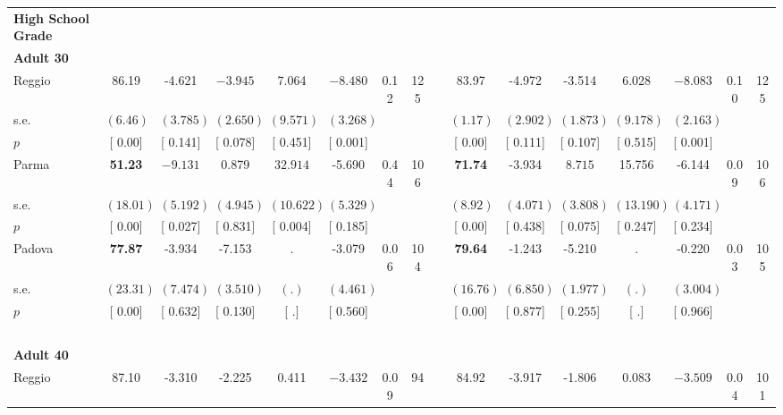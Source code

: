 \begin{longtable}{L{8em} c c c c c c c p{1em} c c c c c c c}
\textbf{High School Grade} \\*
\quad \quad \textbf{Adult 30} & & & & & & & & & & & & & & & \\* 
\quad \quad \quad Reggio& 86.19 &    -4.621 & $ \mathbf{   -3.945}$ &     7.064 & $ \mathbf{   -8.480}$ &      0.12 &       125 & & 83.97 &    -4.972 &    -3.514 &     6.028 & $ \mathbf{   -8.083}$ &      0.10 &       125  \\*
\quad \quad \quad \quad s.e.& $ (     6.46)$ & $ (    3.785)$ & $ (    2.650)$ & $ (    9.571)$ & $ (    3.268)$ & & & & $ (     1.17)$ & $ (    2.902)$ & $ (    1.873)$ & $ (    9.178)$ & $ (    2.163)$ & &  \\*
\quad \quad \quad \quad $ p$ & [     0.00] & [    0.141] & [    0.078] & [    0.451] & [    0.001] & & & & [     0.00] & [    0.111] & [    0.107] & [    0.515] & [    0.001] & &  \\[1em]
\quad \quad \quad Parma& \textbf{    51.23} & $ \mathbf{   -9.131}$ &     0.879 & $ \mathbf{   32.914}$ &    -5.690 &      0.44 &       106 & & \textbf{    71.74} &    -3.934 & $ \mathbf{    8.715}$ &    15.756 &    -6.144 &      0.09 &       106  \\*
\quad \quad \quad \quad s.e.& $ (    18.01)$ & $ (    5.192)$ & $ (    4.945)$ & $ (   10.622)$ & $ (    5.329)$ & & & & $ (     8.92)$ & $ (    4.071)$ & $ (    3.808)$ & $ (   13.190)$ & $ (    4.171)$ & &  \\*
\quad \quad \quad \quad $ p$ & [     0.00] & [    0.027] & [    0.831] & [    0.004] & [    0.185] & & & & [     0.00] & [    0.438] & [    0.075] & [    0.247] & [    0.234] & &  \\[1em]
\quad \quad \quad Padova& \textbf{    77.87} &    -3.934 &    -7.153 &         . &    -3.079 &      0.06 &       104 & & \textbf{    79.64} &    -1.243 &    -5.210 &         . &    -0.220 &      0.03 &       105  \\*
\quad \quad \quad \quad s.e.& $ (    23.31)$ & $ (    7.474)$ & $ (    3.510)$ & $ (        .)$ & $ (    4.461)$ & & & & $ (    16.76)$ & $ (    6.850)$ & $ (    1.977)$ & $ (        .)$ & $ (    3.004)$ & &  \\*
\quad \quad \quad \quad $ p$ & [     0.00] & [    0.632] & [    0.130] & [        .] & [    0.560] & & & & [     0.00] & [    0.877] & [    0.255] & [        .] & [    0.966] & &  \\[1em]
~\\[1em]
\quad \quad \textbf{Adult 40} & & & & & & & & & & & & & & & \\* 
\quad \quad \quad Reggio& 87.10 &    -3.310 &    -2.225 &     0.411 & $ \mathbf{   -3.432}$ &      0.09 &        94 & & 84.92 &    -3.917 &    -1.806 &     0.083 & $ \mathbf{   -3.509}$ &      0.04 &       101  \\*

\end{longtable}
